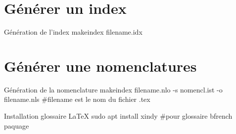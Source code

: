 
\chapter{Générer un index}
\begin{Bash}{Génération de l'index}
makeindex filename.idx
\end{Bash}

\chapter{Générer une nomenclatures}
\begin{Bash}{Génération de la nomenclature}
makeindex filename.nlo -s nomencl.ist -o filename.nls
#filename est le nom du fichier .tex
\end{Bash}

\begin{Bash}{Installation glossaire \LaTeX}
sudo apt install xindy #pour glossaire bfrench paquage
\end{Bash}